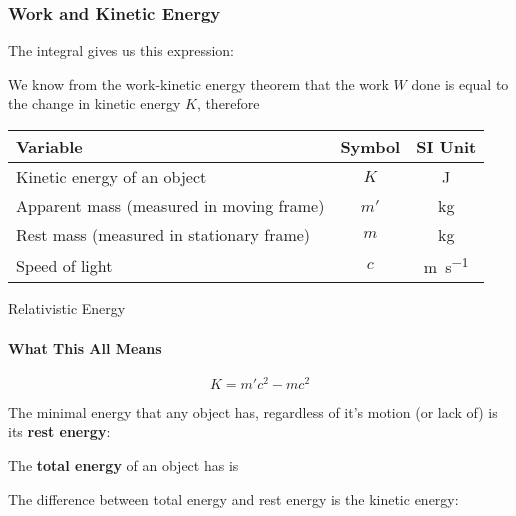 \documentclass[12pt,compress,aspectratio=169]{beamer}
\newcommand{\eq}[2]{\vspace{#1}{\Large\begin{displaymath}#2\end{displaymath}}}
\begin{document}
\begin{frame}
  \frametitle{Work and Kinetic Energy}

  The integral gives us this expression:
  
  \eq{-.25in}{
    W=\gamma mc^2-mc^2
  }

  \vspace{-.15in}We know from the work-kinetic energy theorem that the work $W$
  done is equal to the change in kinetic energy $K$, therefore
  
  \eq{-.2in}{ \boxed{K=m'c^2-mc^2} }

  \vspace{-.1in}
  \begin{center}
    \begin{tabular}{l|c|c}
      \rowcolor{pink}
      \textbf{Variable} & \textbf{Symbol} & \textbf{SI Unit}\\ \hline
      Kinetic energy of an object & $K$  & \si{\joule}\\
      Apparent mass (measured in moving frame) & $m'$ & \si{\kilo\gram}\\
      Rest mass (measured in stationary frame) & $m$  & \si{\kilo\gram}\\
      Speed of light              & $c$ & \si{\metre\per\second}
    \end{tabular}
  \end{center}
\end{frame}



\begin{frame}{Relativistic Energy}
  \framesubtitle{What This All Means}
  {\Large
    \begin{displaymath}
      \boxed{K=m'c^2-mc^2}
    \end{displaymath}
  }

  The minimal energy that any object has, regardless of it's motion (or lack
  of) is its \textbf{rest energy}:
  
  \eq{-.4in}{ E_0=mc^2 }

  \vspace{-.2in}The \textbf{total energy} of an object has is
    
  \eq{-.3in}{
    E_T=m'c^2=\gamma mc^2
  }

  \vspace{-.2in}The difference between total energy and rest energy is the
  kinetic energy:

  \eq{-.3in}{
    K=E_T-E_0
  }
\end{frame}
\end{document}
